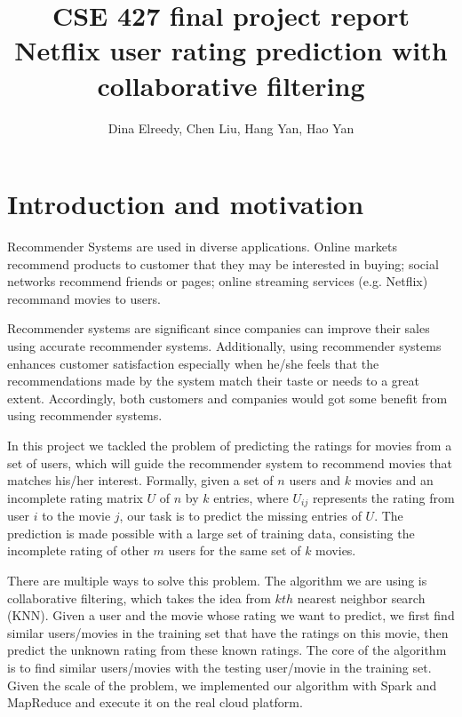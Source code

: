 \documentclass{article}
\title{CSE 427 final project report\\ Netflix user rating prediction
  with collaborative filtering}
\author{Dina Elreedy, Chen Liu, Hang Yan, Hao Yan}
\begin{document}
\maketitle
\section{Introduction and motivation}
Recommender Systems are used in diverse applications. Online markets
recommend products to customer that they may be interested in buying;
social networks recommend friends or pages; online streaming services
(e.g. Netflix) recommand movies to users. 

Recommender systems are significant since companies can improve their
sales using accurate recommender systems. Additionally, using
recommender systems enhances customer satisfaction especially when
he/she feels that the recommendations made by the system match their
taste or needs to a great extent. Accordingly, both customers and
companies would got some benefit from using recommender systems.

In this project we tackled the problem of predicting the ratings for
movies from a set of users, which will guide the recommender system to
recommend movies that matches his/her interest. Formally, given a set
of $n$ users and $k$ movies and an incomplete rating matrix $U$ of $n$
by $k$ entries, where $U_{ij}$ represents the rating from user $i$ to
the movie $j$, our task is to predict the missing entries of $U$. The
prediction is made possible with a large set of training data,
consisting the incomplete rating of other $m$ users for the same set
of $k$ movies.

There are multiple ways to solve this problem. The algorithm we are
using is collaborative filtering, which takes the idea from $kth$
nearest neighbor search (KNN). Given a user and the movie whose rating
we want to predict, we first find similar users/movies in the training
set that have the ratings on this movie, then predict the unknown
rating from these known ratings. The core of the algorithm is to find
similar users/movies with the testing user/movie in the training
set. Given the scale of the problem, we implemented our algorithm with
Spark and MapReduce and execute it on the real cloud platform.


\end{document}
